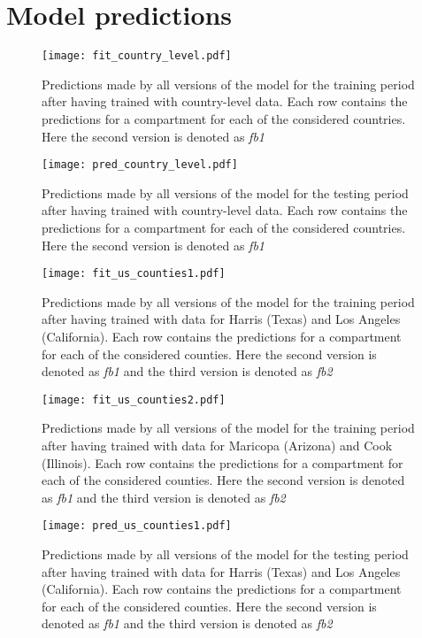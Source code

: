\appendix

\chapter{Model predictions}

\begin{figure}[!htb]
    \centering
    \texttt{[image: fit\_country\_level.pdf]}
    \caption{Predictions made by all versions of the model for the training period after having trained with country-level data. Each row contains the predictions for a compartment for each of the considered countries. Here the second version is denoted as \textit{fb1}}
    \label{fig:fit-country-level}
\end{figure}

\begin{figure}[!htb]
    \centering
    \texttt{[image: pred\_country\_level.pdf]}
    \caption{Predictions made by all versions of the model for the testing period after having trained with country-level data. Each row contains the predictions for a compartment for each of the considered countries. Here the second version is denoted as \textit{fb1}}
    \label{fig:pred-country-level}
\end{figure}

\begin{figure}[!htb]
    \centering
    \texttt{[image: fit\_us\_counties1.pdf]}
    \caption{Predictions made by all versions of the model for the training period after having trained with data for Harris (Texas) and Los Angeles (California). Each row contains the predictions for a compartment for each of the considered counties. Here the second version is denoted as \textit{fb1} and the third version is denoted as \textit{fb2}}
    \label{fig:fit-us-counties1}
\end{figure}

\begin{figure}[!htb]
    \centering
    \texttt{[image: fit\_us\_counties2.pdf]}
    \caption{Predictions made by all versions of the model for the training period after having trained with data for Maricopa (Arizona) and Cook (Illinois). Each row contains the predictions for a compartment for each of the considered counties. Here the second version is denoted as \textit{fb1} and the third version is denoted as \textit{fb2}}
    \label{fig:fit-us-counties2}
\end{figure}

\begin{figure}[!htb]
    \centering
    \texttt{[image: pred\_us\_counties1.pdf]}
    \caption{Predictions made by all versions of the model for the testing period after having trained with data for Harris (Texas) and Los Angeles (California). Each row contains the predictions for a compartment for each of the considered counties. Here the second version is denoted as \textit{fb1} and the third version is denoted as \textit{fb2}}
    \label{fig:pred-us-counties1}
\end{figure}

